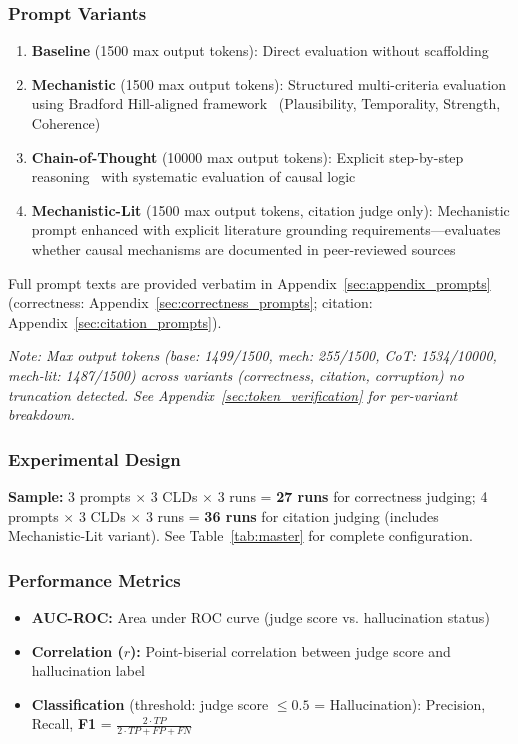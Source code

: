 \subsubsection{Prompt Variants}
\begin{enumerate}[noitemsep]
    \item \textbf{Baseline} (1500 max output tokens): Direct evaluation without scaffolding
    \item \textbf{Mechanistic} (1500 max output tokens): Structured multi-criteria evaluation using Bradford Hill-aligned framework~\cite{shimonovich2020bradford} (Plausibility, Temporality, Strength, Coherence)
    \item \textbf{Chain-of-Thought} (10000 max output tokens): Explicit step-by-step reasoning~\cite{kojima2022large} with systematic evaluation of causal logic
    \item \textbf{Mechanistic-Lit} (1500 max output tokens, citation judge only): Mechanistic prompt enhanced with explicit literature grounding requirements---evaluates whether causal mechanisms are documented in peer-reviewed sources
\end{enumerate}
Full prompt texts are provided verbatim in Appendix~\ref{sec:appendix_prompts} (correctness: Appendix~\ref{sec:correctness_prompts}; citation: Appendix~\ref{sec:citation_prompts}).

\textit{Note: Max output tokens (base: 1499/1500, mech: 255/1500, CoT: 1534/10000, mech-lit: 1487/1500) across variants (correctness, citation, corruption) no truncation detected. See Appendix~\ref{sec:token_verification} for per-variant breakdown.}

\subsubsection{Experimental Design}
\textbf{Sample:} 3 prompts $\times$ 3 CLDs $\times$ 3 runs = \textbf{27 runs} for correctness judging; 4 prompts $\times$ 3 CLDs $\times$ 3 runs = \textbf{36 runs} for citation judging (includes Mechanistic-Lit variant). See Table~\ref{tab:master} for complete configuration.

\subsubsection{Performance Metrics}
\begin{itemize}[noitemsep]
    \item \textbf{AUC-ROC:} Area under ROC curve (judge score vs. hallucination status)
    \item \textbf{Correlation ($r$):} Point-biserial correlation between judge score and hallucination label
    \item \textbf{Classification} (threshold: judge score $\leq 0.5$ = Hallucination): Precision, Recall, \textbf{F1} = $\frac{2 \cdot TP}{2 \cdot TP + FP + FN}$
\end{itemize}

